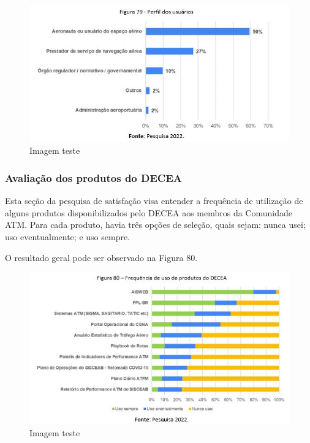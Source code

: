 \documentclass[
]{book}
\begin{document}
\begin{figure}
\centering
\includegraphics{imagens/fig66.jpg}
\caption{Imagem teste}
\end{figure}

\hypertarget{avaliauxe7uxe3o-dos-produtos-do-decea}{%
\subsubsection{Avaliação dos produtos do DECEA}\label{avaliauxe7uxe3o-dos-produtos-do-decea}}

Esta seção da pesquisa de satisfação visa entender a frequência de utilização de alguns produtos disponibilizados pelo DECEA aos membros da Comunidade ATM. Para cada produto, havia três opções de seleção, quais sejam: nunca usei; uso eventualmente; e uso sempre.

O resultado geral pode ser observado na Figura 80.

\begin{figure}
\centering
\includegraphics{imagens/fig67.jpg}
\caption{Imagem teste}
\end{figure}
\end{document}
